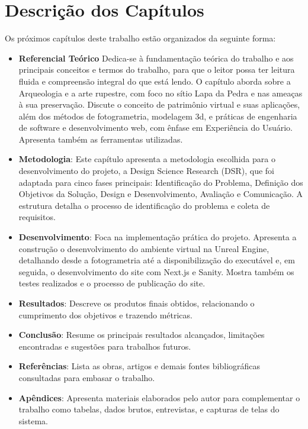 \section{Descrição dos Capítulos}
Os próximos capítulos deste trabalho estão organizados da seguinte forma:
\begin{itemize}
    \item \textbf{Referencial Teórico}
    Dedica-se à fundamentação teórica do trabalho e aos principais conceitos e termos do trabalho, para que o leitor possa ter leitura fluida e compreensão integral do que está lendo. O capítulo aborda sobre a Arqueologia e a arte rupestre, com foco no sítio Lapa da Pedra e nas ameaças à sua preservação. Discute o conceito de patrimônio virtual e suas aplicações, além dos métodos de fotogrametria, modelagem \gls{3d}, e práticas de engenharia de software e desenvolvimento web, com ênfase em Experiência do Usuário. Apresenta também as ferramentas utilizadas.
    
    \item \textbf{Metodologia}: Este capítulo apresenta a metodologia escolhida para o desenvolvimento do projeto, a Design Science Research (DSR), que foi adaptada para cinco fases principais: Identificação do Problema, Definição dos Objetivos da Solução, Design e Desenvolvimento, Avaliação e Comunicação.  A estrutura detalha o processo de identificação do problema e coleta de requisitos.

    
    \item \textbf{Desenvolvimento}: Foca na implementação prática do projeto. Apresenta a construção o desenvolvimento do ambiente virtual na Unreal Engine, detalhando desde a fotogrametria até a disponibilização do executável e, em seguida, o desenvolvimento  do site com Next.js e Sanity. Mostra também os testes realizados e o processo de publicação do site.
    
    \item \textbf{Resultados}: Descreve os produtos finais obtidos, relacionando o cumprimento dos objetivos e trazendo métricas.
    \item \textbf{Conclusão}: Resume os principais resultados alcançados, limitações encontradas e sugestões para trabalhos futuros.
    \item \textbf{Referências}: Lista as obras, artigos e demais fontes bibliográficas consultadas para embasar o trabalho.
    
    \item \textbf{Apêndices}: Apresenta materiais elaborados pelo autor para complementar o trabalho como tabelas, dados brutos, entrevistas, e capturas de telas do sistema.
    
\end{itemize}

